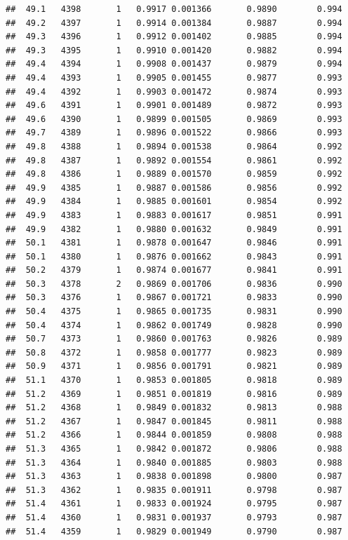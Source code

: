 \documentclass[
]{book}
\begin{document}
\begin{verbatim}
##  49.1   4398       1   0.9917 0.001366       0.9890        0.994
##  49.2   4397       1   0.9914 0.001384       0.9887        0.994
##  49.3   4396       1   0.9912 0.001402       0.9885        0.994
##  49.3   4395       1   0.9910 0.001420       0.9882        0.994
##  49.4   4394       1   0.9908 0.001437       0.9879        0.994
##  49.4   4393       1   0.9905 0.001455       0.9877        0.993
##  49.4   4392       1   0.9903 0.001472       0.9874        0.993
##  49.6   4391       1   0.9901 0.001489       0.9872        0.993
##  49.6   4390       1   0.9899 0.001505       0.9869        0.993
##  49.7   4389       1   0.9896 0.001522       0.9866        0.993
##  49.8   4388       1   0.9894 0.001538       0.9864        0.992
##  49.8   4387       1   0.9892 0.001554       0.9861        0.992
##  49.8   4386       1   0.9889 0.001570       0.9859        0.992
##  49.9   4385       1   0.9887 0.001586       0.9856        0.992
##  49.9   4384       1   0.9885 0.001601       0.9854        0.992
##  49.9   4383       1   0.9883 0.001617       0.9851        0.991
##  49.9   4382       1   0.9880 0.001632       0.9849        0.991
##  50.1   4381       1   0.9878 0.001647       0.9846        0.991
##  50.1   4380       1   0.9876 0.001662       0.9843        0.991
##  50.2   4379       1   0.9874 0.001677       0.9841        0.991
##  50.3   4378       2   0.9869 0.001706       0.9836        0.990
##  50.3   4376       1   0.9867 0.001721       0.9833        0.990
##  50.4   4375       1   0.9865 0.001735       0.9831        0.990
##  50.4   4374       1   0.9862 0.001749       0.9828        0.990
##  50.7   4373       1   0.9860 0.001763       0.9826        0.989
##  50.8   4372       1   0.9858 0.001777       0.9823        0.989
##  50.9   4371       1   0.9856 0.001791       0.9821        0.989
##  51.1   4370       1   0.9853 0.001805       0.9818        0.989
##  51.2   4369       1   0.9851 0.001819       0.9816        0.989
##  51.2   4368       1   0.9849 0.001832       0.9813        0.988
##  51.2   4367       1   0.9847 0.001845       0.9811        0.988
##  51.2   4366       1   0.9844 0.001859       0.9808        0.988
##  51.3   4365       1   0.9842 0.001872       0.9806        0.988
##  51.3   4364       1   0.9840 0.001885       0.9803        0.988
##  51.3   4363       1   0.9838 0.001898       0.9800        0.987
##  51.3   4362       1   0.9835 0.001911       0.9798        0.987
##  51.4   4361       1   0.9833 0.001924       0.9795        0.987
##  51.4   4360       1   0.9831 0.001937       0.9793        0.987
##  51.4   4359       1   0.9829 0.001949       0.9790        0.987

\end{verbatim}
\end{document}
